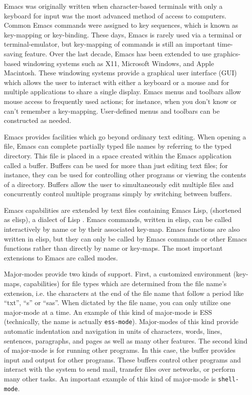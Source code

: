 \documentclass{article}
\newcommand{\stexttt}[1]{{\small\texttt{#1}}}
\begin{document}
Emacs was originally written when character-based terminals with only a 
keyboard for input was the most advanced method of access to computers.  
Common Emacs commands were assigned to key sequences, which is known as 
key-mapping or key-binding.  These days, Emacs is rarely used via a 
terminal or terminal-emulator, but key-mapping of commands is still
an important time-saving feature.
Over the last decade,
Emacs has been extended to use graphics-based windowing systems such as X11,
Microsoft Windows, and Apple Macintosh.  These windowing systems
provide a graphical user interface (GUI) which allows the user to
interact with either a keyboard or a mouse and for multiple 
applications to share a single display.  Emacs menus and
toolbars allow mouse access to frequently used actions; for instance,
when you don't know or can't remember a key-mapping.
User-defined menus and toolbars can be constructed as needed.

Emacs provides facilities which go beyond ordinary text editing.  
When opening a file, Emacs can complete partially typed 
file names by referring to the typed directory.  This file is placed
in a space created within the Emacs application called a buffer.
Buffers can be used for more than just editing text files; for instance,
they can be used for controlling other programs or viewing the contents of
a directory.  Buffers allow the user to simultaneously edit multiple files
and concurrently control multiple programs simply by switching between buffers.

Emacs capabilities are extended by text files containing Emacs Lisp,
(shortened as elisp), a dialect of Lisp
\citep{RChassell1999,PGraham:1996}.  Emacs commands, written
in elisp, can be called interactively by name or by their associated key-map.  
Emacs functions are also written in elisp, but they can only be 
called by Emacs commands or other Emacs functions rather than directly
by name or key-maps.  The most important extensions to
Emacs are called modes.  

Major-modes provide two kinds of support.
First, a customized environment (key-maps, capabilities) for file
types which are determined from the file name's extension, i.e. the characters
at the end of the file name that follow a period like ``txt'', ``s''
or ``sas''.  When dictated by the file name, you can only utilize one 
major-mode at a time.  An example of this kind of major-mode is ESS 
(technically, the name is actually \stexttt{ess-mode}).  Major-modes of this
kind provide automatic indentation and navigation in units of characters,
words, lines, sentences, paragraphs, and pages as well as many other
features.  The second kind of major-mode is for running other programs.  In this
case, the buffer provides input and output for other programs.  These
buffers control other programs and interact with the system to send mail,
transfer files over networks, or perform many other tasks.
An important example of this kind of major-mode is \stexttt{shell-mode}.
\end{document}
